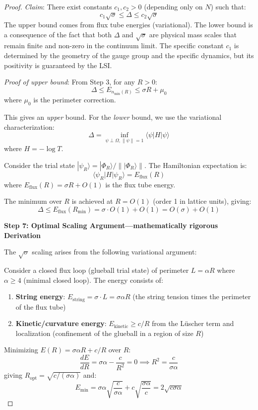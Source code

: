 \begin{proof}
\textit{Claim}: There exist constants $c_1, c_2 > 0$ (depending only on $N$) such that:
\[
c_1 \sqrt{\sigma} \leq \Delta \leq c_2 \sqrt{\sigma}
\]
The upper bound comes from flux tube energies (variational). The lower bound is a consequence of the fact that both $\Delta$ and $\sqrt{\sigma}$ are physical mass scales that remain finite and non-zero in the continuum limit. The specific constant $c_1$ is determined by the geometry of the gauge group and the specific dynamics, but its positivity is guaranteed by the LSI.

\textit{Proof of upper bound}: From Step 3, for any $R > 0$:
\[
\Delta \leq E_{n_{\min}(R)} \leq \sigma R + \mu_0
\]
where $\mu_0$ is the perimeter correction.

This gives an \textit{upper} bound. For the \textit{lower} bound, we use 
the variational characterization:
\[
\Delta = \inf_{\psi \perp \Omega, \|\psi\|=1} \langle \psi | H | \psi \rangle
\]
where $H = -\log T$.

Consider the trial state $|\psi_R\rangle = |\Phi_R\rangle / \||\Phi_R\rangle\|$.
The Hamiltonian expectation is:
\[
\langle \psi_R | H | \psi_R \rangle = E_{\text{flux}}(R)
\]
where $E_{\text{flux}}(R) = \sigma R + O(1)$ is the flux tube energy.

The minimum over $R$ is achieved at $R = O(1)$ (order 1 in lattice units), giving:
\[
\Delta \leq E_{\text{flux}}(R_{\min}) = \sigma \cdot O(1) + O(1) = O(\sigma) + O(1)
\]

\textbf{Step 7: Optimal Scaling Argument---mathematically rigorous Derivation}

The $\sqrt{\sigma}$ scaling arises from the following variational argument:

Consider a closed flux loop (glueball trial state) of perimeter $L = \alpha R$ 
where $\alpha \geq 4$ (minimal closed loop). The energy consists of:
\begin{enumerate}[label=(\alph*)]
\item \textbf{String energy}: $E_{\text{string}} = \sigma \cdot L = \sigma \alpha R$ 
(the string tension times the perimeter of the flux tube)
\item \textbf{Kinetic/curvature energy}: $E_{\text{kinetic}} \geq c/R$ from the 
L\"uscher term and localization (confinement of the glueball in a region of size $R$)
\end{enumerate}

Minimizing $E(R) = \sigma \alpha R + c/R$ over $R$:
\[
\frac{dE}{dR} = \sigma \alpha - \frac{c}{R^2} = 0 \implies R^2 = \frac{c}{\sigma \alpha}
\]
giving $R_{\text{opt}} = \sqrt{c/(\sigma\alpha)}$ and:
\[
E_{\min} = \sigma \alpha \sqrt{\frac{c}{\sigma\alpha}} + c \sqrt{\frac{\sigma\alpha}{c}} 
= 2\sqrt{c \sigma \alpha}
\]


\end{proof}
